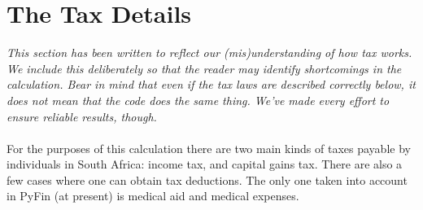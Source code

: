 \documentclass[a4paper, justified]{tufte-handout}
\begin{document}

\newpage
\section{The Tax Details}

\textit{This section has been written to reflect our (mis)understanding of how tax works. We include this deliberately so that the reader may identify shortcomings in the calculation. Bear in mind that even if the tax laws are described correctly below, it does not mean that the code does the same thing. We've made every effort to ensure reliable results, though.}\\\\
For the purposes of this calculation there are two main kinds of taxes payable by individuals in South Africa: income tax, and capital gains tax. There are also a few cases where one can obtain tax deductions. The only one taken into account in PyFin (at present) is medical aid and medical expenses.
\end{document}

